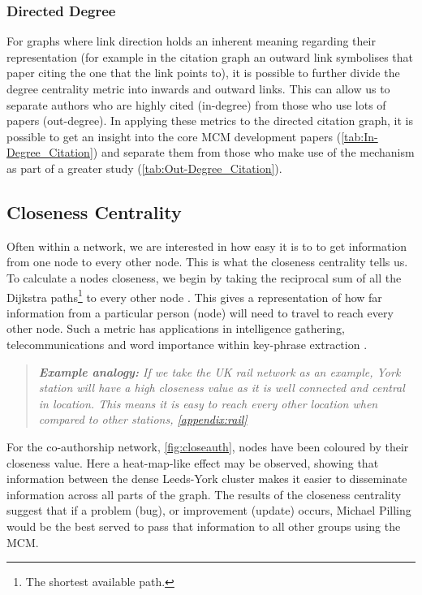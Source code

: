 \subsubsection*{Directed Degree}
For graphs where link direction holds an inherent meaning regarding their representation (for example in the citation graph an outward link symbolises that paper citing the one that the link points to), it is possible to further divide the degree centrality metric into inwards and outward links. This can allow us to separate authors who are highly cited (in-degree) from those who use lots of papers (out-degree). In applying these metrics to the directed citation graph, it is possible to get an insight into the core MCM development papers (\autoref{tab:In-Degree_Citation}) and separate them from those who make use of the mechanism as part of a greater study (\autoref{tab:Out-Degree_Citation}).




\subsection{Closeness Centrality}\label{sec:closeness}
Often within a network, we are interested in how easy it is to to get information from one node to every other node. This is what the closeness centrality tells us. To calculate a nodes closeness, we begin by taking the reciprocal sum of all the Dijkstra paths\footnote{The shortest available path.} to every other node \citep{closeness-book,closeness}.
This gives a representation of how far information from a particular person (node) will need to travel to reach every other node. Such a metric has applications in intelligence gathering, telecommunications and word importance within key-phrase extraction \citep{terror,examples_centrality,phrase}.

\begin{quote}
\textit{
\textbf{Example analogy:} If we take the UK rail network as an example, York station will have a high closeness value as it is well connected and central in location. This means it is easy to reach every other location when compared to other stations, \autoref{appendix:rail}
}
\end{quote}

For the co-authorship network, \autoref{fig:closeauth}, nodes have been coloured by their closeness value. Here a heat-map-like effect may be observed, showing that information between the dense Leeds-York cluster makes it easier to disseminate information across all parts of the graph. The results of the closeness centrality suggest that if a problem (bug), or improvement (update) occurs, Michael Pilling would be the best served to pass that information to all other groups using the MCM.

